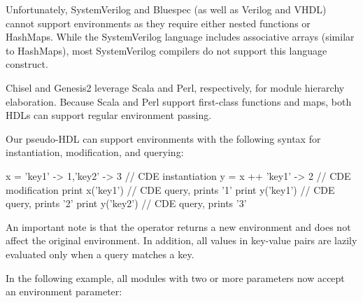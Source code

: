Unfortunately, SystemVerilog and Bluespec (as well as Verilog and VHDL) cannot support environments as they require either nested functions or HashMaps. %
 While the SystemVerilog language includes associative arrays (similar to HashMaps), most SystemVerilog compilers do not support this language construct. 

Chisel and Genesis2 leverage Scala and Perl, respectively, for module hierarchy elaboration. Because Scala and Perl support first-class functions and maps, both HDLs can support regular environment passing.



Our pseudo-HDL can support environments with the following syntax for instantiation, modification, and querying:

\begin{phdl}
x = {'key1' -> 1,'key2' -> 3} // CDE instantiation
y = x ++ {'key1' -> 2}        // CDE modification
print x('key1')               // CDE query, prints '1'
print y('key1')               // CDE query, prints '2'
print y('key2')               // CDE query, prints '3'
\end{phdl}

An important note is that the \code{++}  operator returns a new environment and does not affect the original environment. In addition, all values in key-value pairs are lazily evaluated only when a query matches a key.

In the following example, all modules with two or more parameters now accept an environment parameter:




